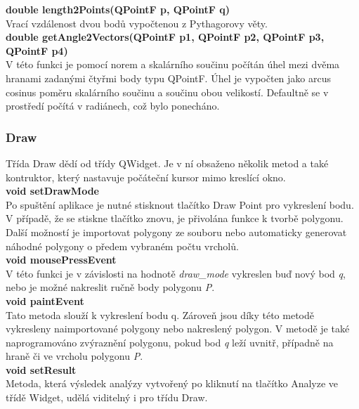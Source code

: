 \documentclass[a4paper,11pt,twoside]{article}
\begin{document}
\noindent\textbf{double length2Points(QPointF p, QPointF q)}\\
Vrací vzdálenost dvou bodů vypočtenou z Pythagorovy věty.\\

\noindent\textbf{double getAngle2Vectors(QPointF p1, QPointF p2, QPointF p3, \\ QPointF p4)}\\
V této funkci je pomocí norem a skalárního součinu počítán úhel mezi dvěma hranami zadanými čtyřmi body typu QPointF. Úhel je vypočten jako arcus cosinus poměru skalárního součinu a součinu obou velikostí. Defaultně se v prostředí počítá v radiánech, což bylo ponecháno.

\newpage
\vspace*{-1cm}
\subsubsection{Draw}
Třída Draw dědí od třídy QWidget. Je v ní obsaženo několik metod a také kontruktor, který nastavuje počáteční kursor mimo kreslící okno.\\

\noindent\textbf{void setDrawMode}\\
Po spuštění aplikace je nutné stisknout tlačítko Draw Point pro vykreslení bodu. V případě, že se stiskne tlačítko znovu, je přivolána funkce k tvorbě polygonu. Další možností je importovat polygony ze souboru nebo automaticky generovat náhodné polygony o předem vybraném počtu vrcholů.\\

\noindent\textbf{void mousePressEvent}\\
V této funkci je v závislosti na hodnotě \textit{draw\_mode} vykreslen buď nový bod \textit{q}, nebo je možné nakreslit ručně body polygonu \textit{P}.\\

\noindent\textbf{void paintEvent}\\
Tato metoda slouží k vykreslení bodu q. Zároveň jsou díky této metodě vykresleny naimportované polygony nebo nakreslený polygon. V metodě je také naprogramováno zvýraznění polygonu, pokud bod \textit{q} leží uvnitř, případně na hraně či ve vrcholu polygonu \textit{P}.\\

\noindent\textbf{void setResult}\\
Metoda, která výsledek analýzy vytvořený po kliknutí na tlačítko Analyze ve třídě Widget, udělá viditelný i pro třídu Draw.\\
\end{document}
